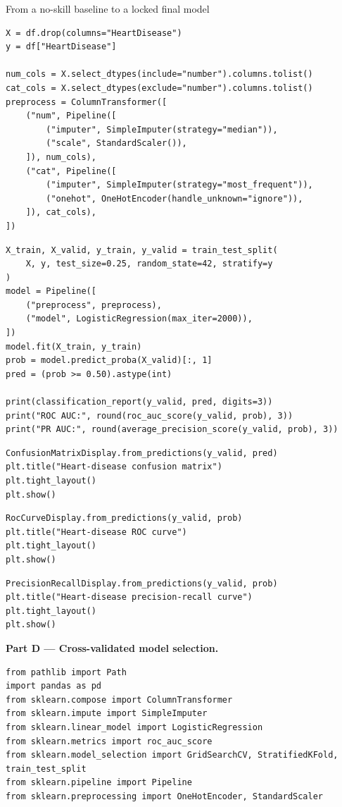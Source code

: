 \begin{labproject}{From a no-skill baseline to a locked final model}
\begin{lstlisting}[style=mlpython]
X = df.drop(columns="HeartDisease")
y = df["HeartDisease"]

num_cols = X.select_dtypes(include="number").columns.tolist()
cat_cols = X.select_dtypes(exclude="number").columns.tolist()
preprocess = ColumnTransformer([
    ("num", Pipeline([
        ("imputer", SimpleImputer(strategy="median")),
        ("scale", StandardScaler()),
    ]), num_cols),
    ("cat", Pipeline([
        ("imputer", SimpleImputer(strategy="most_frequent")),
        ("onehot", OneHotEncoder(handle_unknown="ignore")),
    ]), cat_cols),
])
\end{lstlisting}

\begin{lstlisting}[style=mlpython]
X_train, X_valid, y_train, y_valid = train_test_split(
    X, y, test_size=0.25, random_state=42, stratify=y
)
model = Pipeline([
    ("preprocess", preprocess),
    ("model", LogisticRegression(max_iter=2000)),
])
model.fit(X_train, y_train)
prob = model.predict_proba(X_valid)[:, 1]
pred = (prob >= 0.50).astype(int)

print(classification_report(y_valid, pred, digits=3))
print("ROC AUC:", round(roc_auc_score(y_valid, prob), 3))
print("PR AUC:", round(average_precision_score(y_valid, prob), 3))
\end{lstlisting}

\begin{lstlisting}[style=mlpython]
ConfusionMatrixDisplay.from_predictions(y_valid, pred)
plt.title("Heart-disease confusion matrix")
plt.tight_layout()
plt.show()
\end{lstlisting}

\begin{lstlisting}[style=mlpython]
RocCurveDisplay.from_predictions(y_valid, prob)
plt.title("Heart-disease ROC curve")
plt.tight_layout()
plt.show()
\end{lstlisting}

\begin{lstlisting}[style=mlpython]
PrecisionRecallDisplay.from_predictions(y_valid, prob)
plt.title("Heart-disease precision-recall curve")
plt.tight_layout()
plt.show()
\end{lstlisting}

\medskip\noindent\textbf{Part D --- Cross-validated model selection.}\par
\begin{lstlisting}[style=mlpython]
from pathlib import Path
import pandas as pd
from sklearn.compose import ColumnTransformer
from sklearn.impute import SimpleImputer
from sklearn.linear_model import LogisticRegression
from sklearn.metrics import roc_auc_score
from sklearn.model_selection import GridSearchCV, StratifiedKFold, train_test_split
from sklearn.pipeline import Pipeline
from sklearn.preprocessing import OneHotEncoder, StandardScaler
\end{lstlisting}


\end{labproject}
